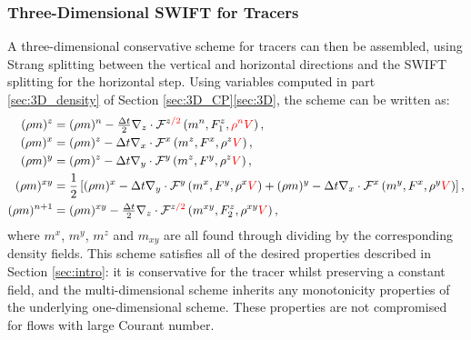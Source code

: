 \documentclass{ametsocV6.1}
\newcommand{\change}[1]{\textcolor{red}{#1}}
\begin{document}
\subsubsection{Three-Dimensional SWIFT for Tracers}
A three-dimensional conservative scheme for tracers can then be assembled, using Strang splitting between the vertical and horizontal directions and the SWIFT splitting for the horizontal step.
Using variables computed in part \ref{sec:3D_density} of Section \ref{sec:3D_CP}\ref{sec:3D}, the scheme can be written as:
\begin{subequations}
\begin{align}
(\rho m)^z & = (\rho m)^n - \tfrac{\Delta t}{2}\nabla_z \cdot \mathcal{F}^{z\change{/2}}\left(m^n, F^z_1, \change{\rho^n}\change{V}\right), \\
(\rho m)^x & = (\rho m)^z - \Delta t \nabla_x \cdot \mathcal{F}^x\left(m^z, F^x, \rho^z\change{V} \right), \\
(\rho m)^y & = (\rho m)^z - \Delta t \nabla_y \cdot \mathcal{F}^y\left(m^z, F^y, \rho^z\change{V} \right), \\
(\rho m)^{xy} & = \frac{1}{2}\left[(\rho m)^x - \Delta t \nabla_y \cdot \mathcal{F}^y\left(m^x, F^y, \rho^x\change{V} \right) + (\rho m)^y - \Delta t \nabla_x \cdot \mathcal{F}^x\left(m^y, F^x,\rho^y\change{V}\right)\right], \\
(\rho m)^{n+1} & = (\rho m)^{xy} - \tfrac{\Delta t}{2}\nabla_z\cdot\mathcal{F}^{z\change{/2}}\left(m^{xy},F_2^z,\rho^{xy}\change{V}\right),
\end{align}
\end{subequations}
where $m^x$, $m^y$, $m^z$ and $m_{xy}$ are all found through dividing by the corresponding density fields.
This scheme satisfies all of the desired properties described in Section \ref{sec:intro}: it is conservative for the tracer whilst preserving a constant field, and the multi-dimensional scheme inherits any monotonicity properties of the underlying one-dimensional scheme.
These properties are not compromised for flows with large Courant number.
\end{document}

